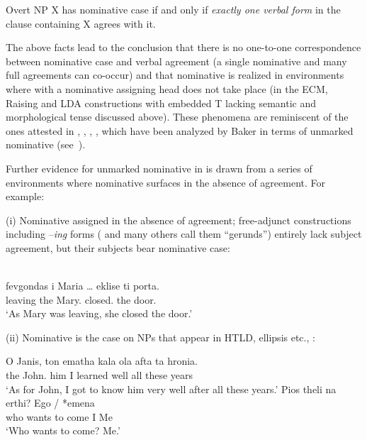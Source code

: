 \documentclass[output=paper]{langsci/langscibook}
\begin{document}
\begin{exe}
    \exi{\eqref{ex:key:13.1}}
    Overt NP X has nominative case if and only if \emph{exactly one verbal
    form} in the clause containing X agrees with it.
\z

The above facts lead to the conclusion that there is no one-to-one
correspondence between nominative case and verbal agreement
(a single nominative and many full agreements can co-occur) and that
nominative is realized in environments where 
with a nominative assigning head does not take place (in
the \gls{ECM}, Raising
and \gls{LDA} constructions with embedded T lacking semantic and morphological
tense discussed above). These phenomena are reminiscent of the ones attested in
, , , , which have been
analyzed by Baker in terms of unmarked nominative
(see~).

Further evidence for unmarked nominative in  is
drawn from a series of environments where nominative
surfaces in the absence of agreement. For example:

(i) Nominative assigned in the absence of agreement;  free-adjunct
constructions including –\emph{ing} forms (\citealt{Tsimpli2000} and many
others call them \enquote{gerunds}) entirely lack subject agreement, but their
subjects bear nominative case:

\ea%
    \label{ex:key:13.30}\\
    \gll  fevgondas i Maria \dots{}     eklise ti porta.\\
            leaving the Mary.\Nom{} {}  closed.\Tsg{} the door.\Acc{}\\
    \glt  ‘As Mary was leaving, she closed the door.’
\z

(ii) Nominative is the case on NPs that appear in HTLD, ellipsis etc.,
\citet{Schutze2001}:

\ea%
    \label{ex:key:13.31}
	\ea
	\gll  O Janis, ton ematha kala ola afta ta hronia.\\
	    the John.\Nom{} him I learned well all these years\\
	\glt     ‘As for John, I got to know him very well after all these years.’
    \ex
	\gll  Pios theli na erthi?  Ego / *emena\\
            who wants to come  I {} \hphantom{*}Me\\
	\glt     ‘Who wants to come? Me.’
    \z
\z


\end{exe}
\end{document}
